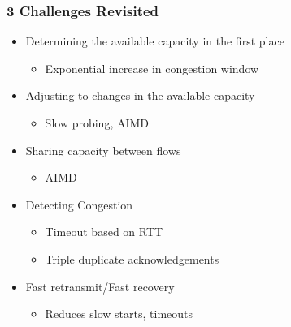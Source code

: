 \subsubsection{3 Challenges Revisited}
\begin{itemize}[nosep]
    \item Determining the available capacity in the first place
          \begin{itemize}[nosep]
              \item Exponential increase in congestion window
          \end{itemize}
    \item Adjusting to changes in the available capacity
          \begin{itemize}[nosep]
              \item Slow probing, AIMD
          \end{itemize}
    \item Sharing capacity between flows
          \begin{itemize}[nosep]
              \item AIMD
          \end{itemize}
    \item Detecting Congestion
          \begin{itemize}[nosep]
              \item Timeout based on RTT
              \item Triple duplicate acknowledgements
          \end{itemize}
    \item Fast retransmit/Fast recovery
          \begin{itemize}[nosep]
              \item Reduces slow starts, timeouts
          \end{itemize}
\end{itemize}